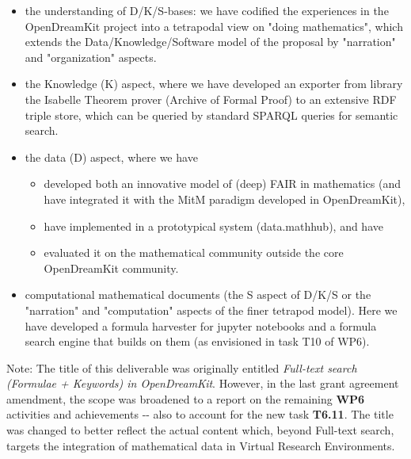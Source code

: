 \begin{itemize}
\tightlist
\item
  the understanding of D/K/S-bases: we have codified the experiences in
  the OpenDreamKit project into a tetrapodal view on "doing
  mathematics", which extends the Data/Knowledge/Software model of the
  proposal by "narration" and "organization" aspects.
\item
  the Knowledge (K) aspect, where we have developed an exporter from
  library the Isabelle Theorem prover (Archive of Formal Proof) to an
  extensive RDF triple store, which can be queried by standard SPARQL
  queries for semantic search.
\item
  the data (D) aspect, where we have

  \begin{itemize}
  \tightlist
  \item
    developed both an innovative model of (deep) FAIR in mathematics
    (and have integrated it with the MitM paradigm developed in
    OpenDreamKit),
  \item
    have implemented in a prototypical system (data.mathhub), and have
  \item
    evaluated it on the mathematical community outside the core
    OpenDreamKit community.
  \end{itemize}
\item
  computational mathematical documents (the S aspect of D/K/S or the
  "narration" and "computation" aspects of the finer tetrapod model).
  Here we have developed a formula harvester for jupyter notebooks and a
  formula search engine that builds on them (as envisioned in task T10
  of WP6).
\end{itemize}

Note: The title of this deliverable was originally entitled
\emph{Full-text search (Formulae + Keywords) in OpenDreamKit}. However,
in the last grant agreement amendment, the scope was broadened to a
report on the remaining \textbf{WP6} activities and achievements -\/-
also to account for the new task \textbf{T6.11}. The title was changed
to better reflect the actual content which, beyond Full-text search,
targets the integration of mathematical data in Virtual Research
Environments.
